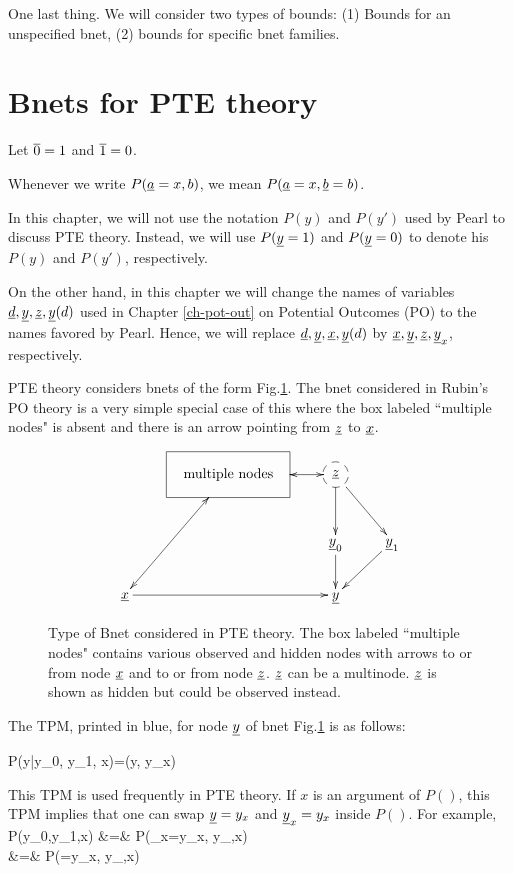 One last thing. 
We will consider two types of bounds: 
(1) Bounds for an unspecified bnet,
(2) bounds for specific bnet families.



\section{Bnets for PTE theory}
\quad

Let $\overline{0}=1$ and $\overline{1}=0$.

Whenever we write $P({\underline{a}}=x, b)$, 
we mean $P({\underline{a}}=x, {\underline{b}}=b)$.

In this chapter, we will
not use the notation
$P(y)$ and $P(y')$
used by Pearl to
discuss PTE theory.
Instead, we will
use $P({\underline{y}}=1)$ and
$P({\underline{y}}=0)$
to denote his 
$P(y)$ and $P(y')$, respectively. 


On the other hand, 
in this chapter
we will change the names 
of variables ${\underline{d}}, {\underline{y}}, {\underline{z}}, {\underline{y}}(d)$
used 
in Chapter \ref{ch-pot-out} on Potential
Outcomes (PO)
to the names favored by Pearl.
Hence, we will replace
${\underline{d}}, {\underline{y}}, {\underline{x}}, {\underline{y}}(d)$
by
${\underline{x}}, {\underline{y}}, {\underline{z}}, {\underline{y}}_x$,
respectively.



PTE theory considers bnets of the form
Fig.\ref{fig-pte-bnet}.
The bnet considered in Rubin's
PO theory
is a very simple special case
of this where the box
labeled ``multiple nodes"
is absent and there is an
arrow pointing
from ${\underline{z}}$ to ${\underline{x}}$.


\begin{figure}[h!]
$$
\xymatrix{
&*++++[F]{\text{multiple nodes}}\ar@{<->}[ldd]
\ar@{<->}[r]
&*++[F-o]{\rvz}\ar[rd]\ar[d]
\\
&&\rvy_0\ar[d]
&\rvy_1\ar[ld]
\\
\rvx\ar[rr]
&&\rvy
}$$
\caption{Type of Bnet
considered in PTE theory.
The box labeled ``multiple nodes"
contains various observed 
and hidden nodes with
arrows
to or from node ${\underline{x}}$
and to or from
node ${\underline{z}}$.
${\underline{z}}$ can be a multinode.
${\underline{z}}$ 
is shown
as hidden but
could be observed instead.
}
\label{fig-pte-bnet}
\end{figure}

The TPM, printed in blue,
 for node ${\underline{y}}$
of bnet Fig.\ref{fig-pte-bnet}
is as follows:


\beq\color{blue}
P(y|y_0, y_1, x)=\delta(y, y_x)
\label{eq-tpm-y-yx}
\eeq

This TPM is used 
frequently
in PTE theory.  If $x$ is an argument
of $P()$, this TPM implies that one
can swap ${\underline{y}}=y_x$
and ${\underline{y}}_x=y_x$
inside $P()$. For example,
\beqa
P(y_0,y_1,x)
&=&
P({\color{red}\rvy_x}=y_x,
 y_{},x)
\\
&=&
P({\color{red}\rvy}=y_x,
 y_{},x)
\eeqa

